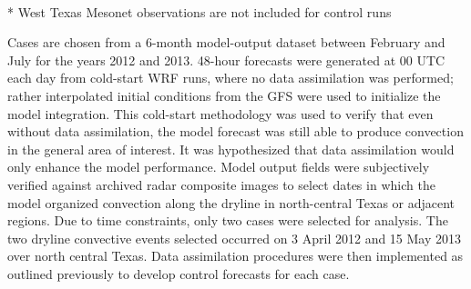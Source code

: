 \documentclass{ttuthes2007}
\newcommand{\tab}{\hspace*{2em}}  %
\begin{document}
	\begin{table}[b] 
	\small
	\caption{Conventional Observations Assimilated} 
	\centering %
 \\
* West Texas Mesonet observations are not included for control runs
	\label{OBS} %
	\end{table} 

\tab Cases are chosen from a 6-month model-output dataset between February and July for the years 2012 and 2013. 48-hour forecasts were generated at 00 UTC each day from cold-start WRF runs, where no data assimilation was performed; rather interpolated initial conditions from the GFS were used to initialize the model integration. This cold-start methodology was used to verify that even without data assimilation, the model forecast was still able to produce convection in the general area of interest. It was hypothesized that data assimilation would only enhance the model performance. Model output fields were subjectively verified against archived radar composite images to select dates in which the model organized convection along the dryline in north-central Texas or adjacent regions. Due to time constraints, only two cases were selected for analysis. The two dryline convective events selected occurred on 3 April 2012 and 15 May 2013 over north central Texas. Data assimilation procedures were then implemented as outlined previously to develop control forecasts for each case. \\
\end{document}
